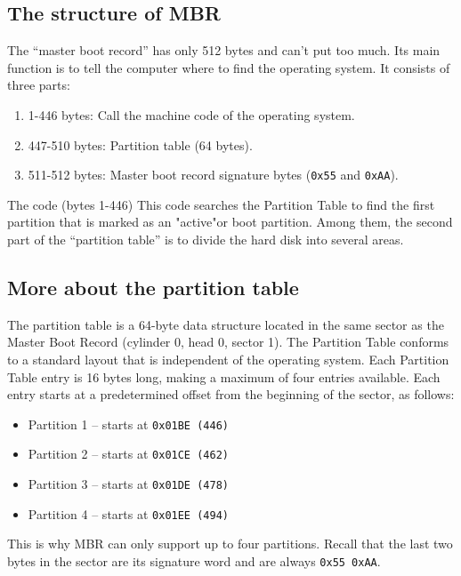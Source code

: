 \documentclass[a4paper]{article}
\begin{document}
\subsection{The structure of MBR}

 The ``master boot record'' has only 512 bytes and can't put too much. Its main function is to tell the computer where to find the operating system. It consists of three parts:

\begin{enumerate}
	\item 1-446 bytes: Call the machine code of the operating system.
	\item 447-510 bytes: Partition table (64 bytes).
	\item 511-512 bytes: Master boot record signature bytes (\texttt{0x55} and \texttt{0xAA}). 
\end{enumerate}

The code (bytes 1-446) This code searches the Partition Table to find the first partition that is marked as an "active"or boot partition. Among them, the second part of the ``partition table'' is to divide the hard disk into several areas. 


\subsection{More about the partition table}

The partition table is a 64-byte data structure located in the same sector as the Master Boot Record (cylinder 0, head 0, sector 1). The Partition Table conforms to a standard layout that is independent of the operating system. Each Partition Table entry is 16 bytes long, making a maximum of four entries available. Each entry starts at a predetermined offset from the beginning of the sector, as follows:

\begin{itemize}
	\item Partition 1 -- starts at \texttt{0x01BE (446)}
	\item Partition 2 -- starts at \texttt{0x01CE (462)}
	\item Partition 3 -- starts at \texttt{0x01DE (478)}
	\item Partition 4 -- starts at \texttt{0x01EE (494)}
\end{itemize}
This is why MBR can only support up to four partitions. Recall that the last two bytes in the sector are its signature word and are always \texttt{0x55 0xAA}.
\end{document}
